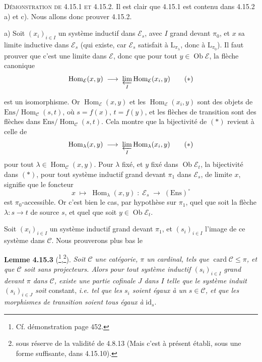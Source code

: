 \documentclass[11pt]{article}
\newcommand{\printedpage}[1]{\marginpar{\footnotesize p.~#1}}
\newcommand{\msp}[1]{\marginpar{\footnotesize [#1]}}
\newcommand{\cE}{\mathcal{E}}
\newcommand{\cC}{\mathcal{C}}
\newcommand{\Ob}{\operatorname{Ob}}
\newcommand{\Hom}{\operatorname{Hom}}
\newcommand{\Ens}{\mathrm{Ens}}
\newcommand{\id}{\mathrm{id}}
\newcommand{\card}{\operatorname{card}}
\begin{document}
\msp{page 427}
\textsc{Démonstration de 4.15.1 et 4.15.2.} Il est clair que 4.15.1 est contenu dans 4.15.2 a) et c). Nous allons donc prouver 4.15.2.

a) Soit $(x_i)_{i\in I}$ un système inductif dans $\cE_s$, avec $I$ grand devant $\pi_0$, et $x$ sa limite inductive dans $\cE_s$ (qui existe, car $\cE_s$ satisfait à $\mathrm{L}_{\pi_\lambda}$, donc à $\mathrm{L}_{\pi_0}$). Il faut prouver que c'est une limite dans $\cE$, donc que pour tout $y \in \Ob\cE$, la flèche canonique
\[
\Hom_{\cE}(x,y) \;\longrightarrow\; \varprojlim_{I} \Hom_{\cE}(x_i,y) \tag*{$(*)$}
\]

\printedpage{163}
est un isomorphisme. Or $\Hom_{\cE}(x,y)$ et les $\Hom_{\cE}(x_i,y)$ sont des objets de $\Ens/\Hom_{\cC}(s,t)$, où $s = f(x)$, $t = f(y)$, et les flèches de transition sont des flèches dans $\Ens/\Hom_{\cC}(s,t)$. Cela montre que la bijectivité de $(*)$ revient à celle de
\[
\Hom_\lambda(x,y) \;\longrightarrow\; \varprojlim_{I} \Hom_\lambda(x_i,y) \tag*{$(*)$}
\]
pour tout $\lambda \in \Hom_{\cC}(x,y)$. Pour $\lambda$ fixé, et $y$ fixé dans $\Ob\cE_t$, la bijectivité dans $(*)$, pour tout système inductif grand devant $\pi_1$ dans $\cE_s$, de limite $x$, signifie que le foncteur
\[
x \;\longmapsto\; \Hom_\lambda(x,y) \;:\; \cE_s \;\longrightarrow\; (\Ens)^\circ
\]
est $\pi_0$-accessible. Or c'est bien le cas, par hypothèse sur $\pi_1$, quel que soit la flèche $\lambda : s \longrightarrow t$ de source $s$, et quel que soit $y \in \Ob\cE_t$.

\msp{page 428}
Soit $(x_i)_{i\in I}$ un système inductif grand devant $\pi_1$, et $(s_i)_{i\in I}$ l'image de ce système dans $\cC$. Nous prouverons plus bas le

\textbf{Lemme 4.15.3} (\footnote{Cf. démonstration page 452.},\footnote{sous réserve de la validité de 4.8.13 (Mais c'est à présent établi, sous une forme suffisante, dans 4.15.10).}). \textit{Soit $\cC$ une catégorie, $\pi$ un cardinal, tels que} $\card\cC \leqslant \pi$\textit{, et que $\cC$ soit sans projecteurs. Alors pour tout système inductif $(s_i)_{i\in I}$ grand devant $\pi$ dans $\cC$, existe une partie cofinale $J$ dans $I$ telle que le système induit $(s_i)_{i\in J}$ soit} constant, \textit{i.e. tel que les $s_i$ soient égaux à un $s \in \cC$, et que les morphismes de transition soient tous égaux à} $\id_s$.
\end{document}
